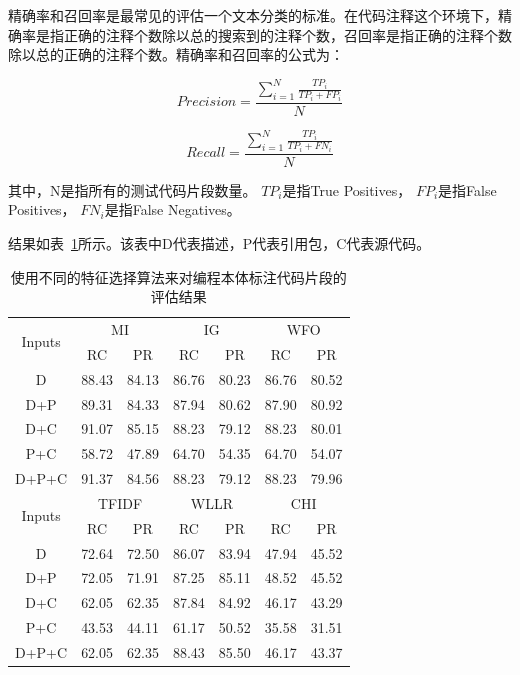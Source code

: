 \documentclass[10pt,journal,draftcls,onecolumn]{IEEEtran}
\begin{document}
\begin{CJK*}{UTF8}{gbsn}
精确率和召回率是最常见的评估一个文本分类的标准。在代码注释这个环境下，精确率是指正确的注释个数除以总的搜索到的注释个数，召回率是指正确的注释个数除以总的正确的注释个数。精确率和召回率的公式为：

\begin{equation}\label{equ_precision}
    Precision=\frac{\sum_{i=1}^{N}{\frac{TP_i}{TP_i+FP_i}}}{N}
\end{equation}

\begin{equation}\label{equ_precision}
    Recall=\frac{\sum_{i=1}^{N}{\frac{TP_i}{TP_i+FN_i}}}{N}
\end{equation}

其中，N是指所有的测试代码片段数量。 $TP_i$是指True Positives，  $FP_i$是指False Positives， $FN_i$是指False Negatives。

结果如表~\ref{table_evaluation}所示。该表中D代表描述，P代表引用包，C代表源代码。

\begin{table}
  \centering
  \caption{使用不同的特征选择算法来对编程本体标注代码片段的评估结果}
  \begin{tabular}{c|c|c|c|c|c|c}
    \hline
  \multirow{2}{*}{Inputs} & \multicolumn{2}{c|}{MI}  &\multicolumn{2}{|c|}{IG}   &\multicolumn{2}{|c}{WFO}      \\
    \cline{2-7}
    &                 RC & PR        & RC & PR        & RC & PR            \\
    \hline
    D       & 88.43 & 84.13 & 86.76 & 80.23 & 86.76 & 80.52 \\
    D+P     & 89.31 & 84.33 & 87.94 & 80.62 & 87.90 & 80.92 \\
    D+C     & 91.07 & 85.15 & 88.23 & 79.12 & 88.23 & 80.01 \\
    P+C     & 58.72 & 47.89 & 64.70 & 54.35 & 64.70 & 54.07 \\
    D+P+C   & 91.37 & 84.56 & 88.23 & 79.12 & 88.23 & 79.96 \\
    \hline

    \hline
  \multirow{2}{*}{Inputs} & \multicolumn{2}{c|}{TFIDF}  &\multicolumn{2}{|c|}{WLLR}   &\multicolumn{2}{|c}{CHI}      \\
    \cline{2-7}
    &                 RC & PR        & RC & PR        & RC & PR            \\
    \hline
    D       & 72.64 & 72.50 & 86.07 & 83.94 & 47.94 & 45.52 \\
   D+P     & 72.05 & 71.91 & 87.25 & 85.11 & 48.52 & 45.52 \\
    D+C     & 62.05 & 62.35 & 87.84 & 84.92 & 46.17 & 43.29 \\
    P+C     & 43.53 & 44.11 & 61.17 & 50.52 & 35.58 & 31.51 \\
    D+P+C   & 62.05 & 62.35 & 88.43 & 85.50 & 46.17 & 43.37 \\
    \hline
  \end{tabular}
   \label{table_evaluation}
\end{table}

\end{CJK*}
\end{document}

